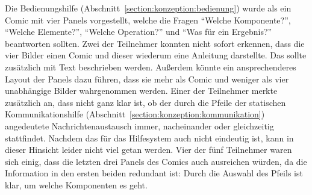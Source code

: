 \documentclass[
	headsepline,
	footsepline,
	fontsize=12pt,
	bibliography=totoc
]{scrbook}
\begin{document}

Die Bedienungshilfe (Abschnitt~\ref{section:konzeption:bedienung}) wurde als ein Comic mit vier Panels vorgestellt, welche die Fragen \enquote{Welche Komponente?}, \enquote{Welche Elemente?}, \enquote{Welche Operation?} und \enquote{Was für ein Ergebnis?} beantworten sollten. Zwei der Teilnehmer konnten nicht sofort erkennen, dass die vier Bilder einen Comic und dieser wiederum eine Anleitung darstellte. Das sollte zusätzlich mit Text beschrieben werden. Außerdem könnte ein ansprechenderes Layout der Panels dazu führen, dass sie mehr als Comic und weniger als vier unabhängige Bilder wahrgenommen werden. Einer der Teilnehmer merkte zusätzlich an, dass nicht ganz klar ist, ob der durch die Pfeile der statischen Kommunikationshilfe (Abschnitt~\ref{section:konzeption:kommunikation}) angedeutete Nachrichtenaustausch immer, nacheinander oder gleichzeitig stattfindet. Nachdem das für das Hilfesystem auch nicht eindeutig ist, kann in dieser Hinsicht leider nicht viel getan werden. Vier der fünf Teilnehmer waren sich einig, dass die letzten drei Panels des Comics auch ausreichen würden, da die Information in den ersten beiden redundant ist: Durch die Auswahl des Pfeils ist klar, um welche Komponenten es geht.
\end{document}
